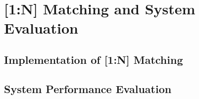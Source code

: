 \section{[1:N] Matching and System Evaluation}

\subsection{Implementation of [1:N] Matching}
\subsection{System Performance Evaluation}